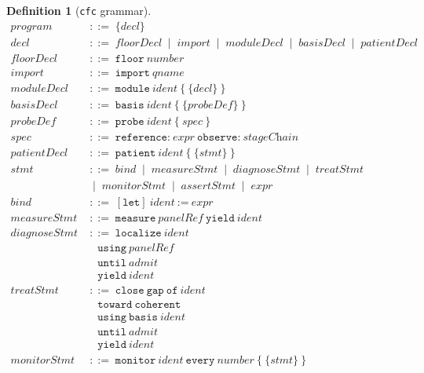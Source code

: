 \documentclass[11pt,a4paper]{article}
\theoremstyle{cfcthm}
\theoremstyle{definition}
\newtheorem{definition}[theorem]{Definition}
\theoremstyle{remark}
\newcommand{\bnf}{\;::=\;}
\newcommand{\alt}{\;\mid\;}
\newcommand{\cf}[1]{\texttt{#1}}
\begin{document}
\begin{definition}[\cf{cfc} grammar]
\label{def:grammar}
\begin{align*}
\textit{program} &\bnf \{\textit{decl}\}\\[2pt]
\textit{decl} &\bnf \textit{floorDecl}\alt\textit{import}\alt\textit{moduleDecl}
   \alt\textit{basisDecl}\alt\textit{patientDecl}\\[2pt]
\textit{floorDecl} &\bnf \cf{floor}\ \textit{number}\\
\textit{import} &\bnf \cf{import}\ \textit{qname}\\
\textit{moduleDecl} &\bnf \cf{module}\ \textit{ident}\ \cf{\{}\ \{\textit{decl}\}\ \cf{\}}\\[2pt]
\textit{basisDecl} &\bnf \cf{basis}\ \textit{ident}\ \cf{\{}\ \{\textit{probeDef}\}\ \cf{\}}\\
\textit{probeDef} &\bnf \cf{probe}\ \textit{ident}\ \cf{\{}\ \textit{spec}\ \cf{\}}\\
\textit{spec} &\bnf \cf{reference}\cf{:}\ \textit{expr}\ \cf{observe}\cf{:}\ \textit{stageChain}\\[2pt]
\textit{patientDecl} &\bnf \cf{patient}\ \textit{ident}\ \cf{\{}\ \{\textit{stmt}\}\ \cf{\}}\\[2pt]
\textit{stmt} &\bnf \textit{bind}\alt\textit{measureStmt}\alt\textit{diagnoseStmt}
   \alt\textit{treatStmt}\\
  &\alt\textit{monitorStmt}\alt\textit{assertStmt}\alt\textit{expr}\\[2pt]
\textit{bind} &\bnf [\cf{let}]\ \textit{ident}\ \cf{:=}\ \textit{expr}\\[2pt]
\textit{measureStmt} &\bnf \cf{measure}\ \textit{panelRef}\ \cf{yield}\ \textit{ident}\\[2pt]
\textit{diagnoseStmt} &\bnf \cf{localize}\ \textit{ident}\\
  &\quad \cf{using}\ \textit{panelRef}\\
  &\quad \cf{until}\ \textit{admit}\\
  &\quad \cf{yield}\ \textit{ident}\\[2pt]
\textit{treatStmt} &\bnf \cf{close}\ \cf{gap}\ \cf{of}\ \textit{ident}\\
  &\quad \cf{toward}\ \cf{coherent}\\
  &\quad \cf{using}\ \cf{basis}\ \textit{ident}\\
  &\quad \cf{until}\ \textit{admit}\\
  &\quad \cf{yield}\ \textit{ident}\\[2pt]
\textit{monitorStmt} &\bnf \cf{monitor}\ \textit{ident}\ \cf{every}\ \textit{number}\ \cf{\{}\ \{\textit{stmt}\}\ \cf{\}}\\[2pt]

\end{align*}
\end{definition}
\end{document}
